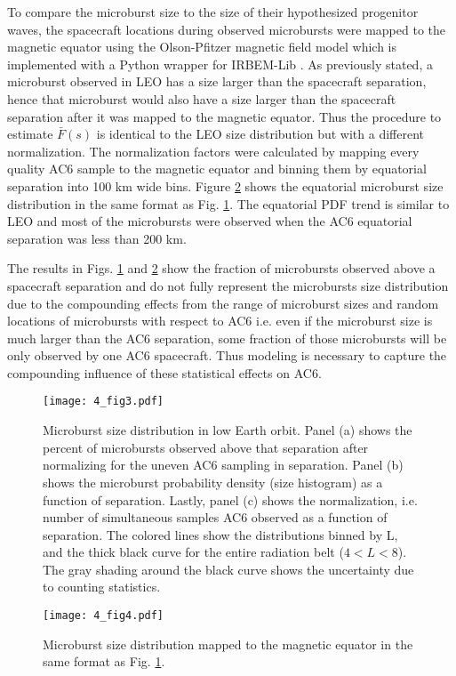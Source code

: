 To compare the microburst size to the size of their hypothesized progenitor waves, the spacecraft locations during observed microbursts were mapped to the magnetic equator using the Olson-Pfitzer magnetic field model \citep{Olson1982} which is implemented with a Python wrapper for IRBEM-Lib \citep{irbem}. As previously stated, a microburst observed in LEO has a size larger than the spacecraft separation, hence that microburst would also have a size larger than the spacecraft separation after it was mapped to the magnetic equator. Thus the procedure to estimate $\bar{F}(s)$ is identical to the LEO size distribution but with a different normalization. The normalization factors were calculated by mapping every quality AC6 sample to the magnetic equator and binning them by equatorial separation into 100 km wide bins. Figure \ref{fig4} shows the equatorial microburst size distribution in the same format as Fig. \ref{fig3}. The equatorial PDF trend is similar to LEO and most of the microbursts were observed when the AC6 equatorial separation was less than 200 km. 

The results in Figs. \ref{fig3} and \ref{fig4} show the fraction of microbursts observed above a spacecraft separation and do not fully represent the microbursts size distribution due to the compounding effects from the range of microburst sizes and random locations of microbursts with respect to AC6 i.e. even if the microburst size is much larger than the AC6 separation, some fraction of those microbursts will be only observed by one AC6 spacecraft. Thus modeling is necessary to capture the compounding influence of these statistical effects on AC6.

\begin{figure}
\texttt{[image: 4\_fig3.pdf]}
\caption{Microburst size distribution in low Earth orbit. Panel (a) shows the percent of microbursts observed above that separation after normalizing for the uneven AC6 sampling in separation. Panel (b) shows the microburst probability density (size histogram) as a function of separation. Lastly, panel (c) shows the normalization, i.e. number of simultaneous samples AC6 observed as a function of separation. The colored lines show the distributions binned by L, and the thick black curve for the entire radiation belt ($4 < L < 8$). The gray shading around the black curve shows the uncertainty due to counting statistics.}
\label{fig3}
\end{figure}

\begin{figure}
\texttt{[image: 4\_fig4.pdf]}
\caption{Microburst size distribution mapped to the magnetic equator in the same format as Fig. \ref{fig3}.} 
\label{fig4}
\end{figure}

